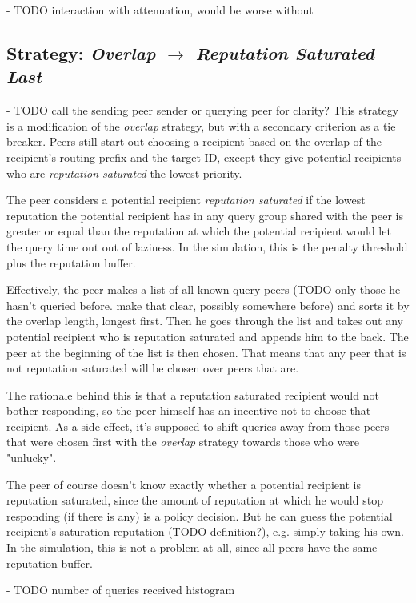 - TODO interaction with attenuation, would be worse without

\subsection{Strategy: \emph{Overlap $\rightarrow$ Reputation Saturated Last}}
- TODO call the sending peer sender or querying peer for clarity?
This strategy is a modification of the \emph{overlap} strategy, but with a
secondary criterion as a tie breaker. Peers still start out choosing a recipient
based on the overlap of the recipient's routing prefix and the target ID, except
they give potential recipients who are \emph{reputation saturated} the lowest
priority.

The peer considers a potential recipient \emph{reputation saturated} if the
lowest reputation the potential recipient has in any query group shared with the
peer is greater or equal than the reputation at which the potential recipient
would let the query time out out of laziness. In the simulation, this is the
penalty threshold plus the reputation buffer.

Effectively, the peer makes a list of all known query peers (TODO only those he
hasn't queried before. make that clear, possibly somewhere before) and sorts it
by the overlap length, longest first. Then he goes through the list and takes
out any potential recipient who is reputation saturated and appends him to the
back. The peer at the beginning of the list is then chosen. That means that any
peer that is not reputation saturated will be chosen over peers that are.

The rationale behind this is that a reputation saturated recipient would not
bother responding, so the peer himself has an incentive not to choose that
recipient. As a side effect, it's supposed to shift queries away from those
peers that were chosen first with the \emph{overlap} strategy towards those who
were "unlucky".

The peer of course doesn't know exactly whether a potential recipient is
reputation saturated, since the amount of reputation at which he would stop
responding (if there is any) is a policy decision. But he can guess the
potential recipient's saturation reputation (TODO definition?), e.g. simply
taking his own. In the simulation, this is not a problem at all, since all peers
have the same reputation buffer.

- TODO number of queries received histogram

